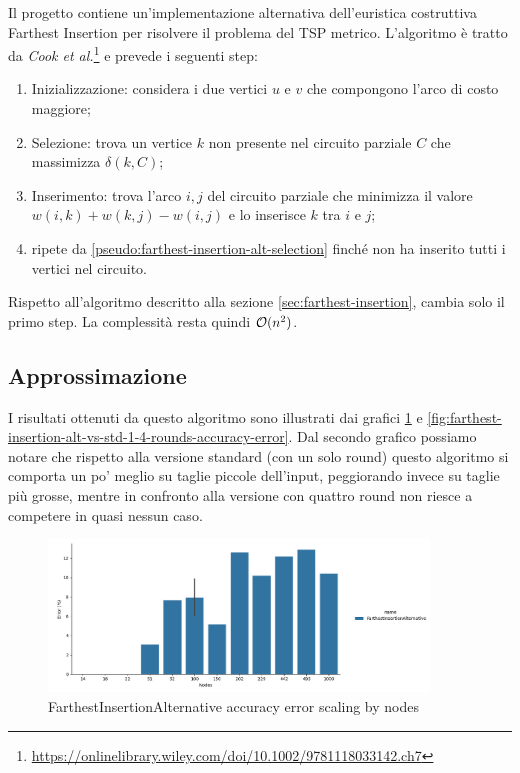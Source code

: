 Il progetto  contiene
un'implementazione alternativa dell'euristica costruttiva Farthest
Insertion per risolvere il problema del TSP metrico. L'algoritmo è
tratto da \textit{Cook et al.}\footnote{\url{https://onlinelibrary.wiley.com/doi/10.1002/9781118033142.ch7}}
e prevede i seguenti step:

\begin{enumerate}
    \item Inizializzazione: considera i due vertici $u$ e $v$ che
      compongono l'arco di costo maggiore;
    \item Selezione: trova un vertice $k$ non presente nel circuito
      parziale $C$ che massimizza $\delta(k,C)$;
    \label{pseudo:farthest-insertion-alt-selection}
    \item Inserimento: trova l’arco ${i, j}$ del circuito parziale che
      minimizza il valore $w(i, k) + w(k, j) - w(i, j)$ e lo inserisce
      $k$ tra $i$ e $j$;
    \item ripete da \ref{pseudo:farthest-insertion-alt-selection}
      finché non ha inserito tutti i vertici nel circuito.
\end{enumerate}

Rispetto all'algoritmo descritto alla sezione
\ref{sec:farthest-insertion}, cambia solo il primo step. La
complessità resta quindi $\mathcal{O}(n^2)$.

\subsection{Approssimazione}

I risultati ottenuti da questo algoritmo sono illustrati dai grafici
\ref{fig:farthest-insertion-alt-accuracy-error} e
\ref{fig:farthest-insertion-alt-vs-std-1-4-rounds-accuracy-error}.
Dal secondo grafico possiamo notare che rispetto alla versione
standard (con un solo round) questo algoritmo si comporta un po'
meglio su taglie piccole dell'input, peggiorando invece su taglie più
grosse, mentre in confronto alla versione con quattro round non riesce
a competere in quasi nessun caso.

\begin{figure}[!ht]
    \centering

    \includegraphics[width=0.9\textwidth]{./images/FarthestInsertionAlternative__approximation_error_.png}

    \caption{FarthestInsertionAlternative accuracy error scaling by nodes}
    \label{fig:farthest-insertion-alt-accuracy-error}
\end{figure}

